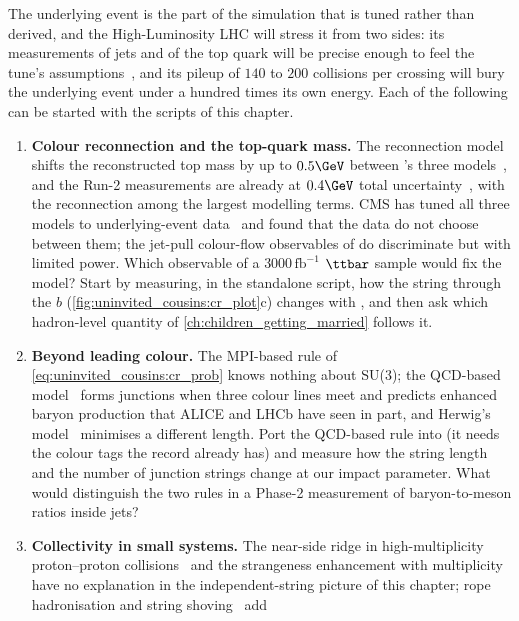 The underlying event is the part of the simulation that is tuned rather
than derived, and the High-Luminosity LHC will stress it from two sides:
its measurements of jets and of the top quark will be precise enough to
feel the tune's assumptions~\cite{Azzi:2019yne}, and its pileup of $140$ to
$200$ collisions per crossing will bury the underlying event under a
hundred times its own energy. Each of the following can be started with the
scripts of this chapter.
\begin{enumerate}
  \item \textbf{Colour reconnection and the top-quark mass.} The
    reconnection model shifts the reconstructed top mass by up to
    $0.5\GeV$ between \PYTHIA's three models~\cite{Argyropoulos:2014zoa},
    and the Run-2 measurements are already at $0.4\GeV$ total
    uncertainty~\cite{CMS:2023ebf,ATLAS:2024dxp}, with the reconnection
    among the largest modelling terms. CMS has tuned all three models to
    underlying-event data~\cite{CMS:2022awf} and found that the data do not
    choose between them; the jet-pull colour-flow observables of
    \cite{ATLAS:2018olo} do discriminate but with limited power. Which
    observable of a $3000\,\mathrm{fb}^{-1}$ $\ttbar$ sample would fix the
    model? Start by measuring, in the standalone script, how the string
    through the $b$ (\cref{fig:uninvited_cousins:cr_plot}c) changes with
    , and then ask which hadron-level quantity of
    \cref{ch:children_getting_married} follows it.
  \item \textbf{Beyond leading colour.} The MPI-based rule of
    \cref{eq:uninvited_cousins:cr_prob} knows nothing about SU(3); the
    QCD-based model~\cite{Christiansen:2015yqa} forms junctions when three
    colour lines meet and predicts enhanced baryon production that ALICE
    and LHCb have seen in part, and Herwig's model~\cite{Gieseke:2012ft}
    minimises a different length. Port the QCD-based rule into
     (it needs the colour tags the record already has) and
    measure how the string length and the number of junction strings
    change at our impact parameter. What would distinguish the two rules in
    a Phase-2 measurement of baryon-to-meson ratios inside jets?
  \item \textbf{Collectivity in small systems.} The near-side ridge in
    high-multiplicity proton--proton collisions~\cite{CMS:2010ifv} and the
    strangeness enhancement with multiplicity have no explanation in the
    independent-string picture of this chapter; rope hadronisation and
    string shoving~\cite{Bierlich:2014xba,Bierlich:2017vhg} add

\end{enumerate}

